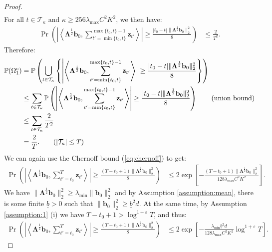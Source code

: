 \begin{proof}
\begin{align*}
\end{align*}
For all $t \in \mathcal{T}_{\kappa}$ and $\kappa \geq 256\lambda_{\max}C^2K^2$, we then have: 
\begin{align*}
    \Pr\left(\left|\left\langle\boldsymbol{\Lambda}^{\frac{1}{2}}\mathbf{b}_0, \sum_{t'=\min\{t_0,t\}}^{\max\{t_0,t\}-1}\mathbf{z}_{t'} \right\rangle\right| \geq \frac{|t_0-t| \lVert\boldsymbol{\Lambda}^{\frac{1}{2}} \mathbf{b}_0\rVert_2^2}{8}\right) &\leq \frac{2}{T^2}.
\end{align*}
Therefore:
\begin{align*}
    \Pr(\Omega^c_1) &= \Pr\left(\bigcup_{t \in \mathcal{T}_{\kappa}} \left\{\left|\left\langle\boldsymbol{\Lambda}^{\frac{1}{2}}\mathbf{b}_0, \sum_{t'=\min\{t_0,t\}}^{\max\{t_0,t\}-1}\mathbf{z}_{t'} \right\rangle\right| \geq \frac{|t_0-t| \lVert\boldsymbol{\Lambda}^{\frac{1}{2}} \mathbf{b}_0\rVert_2^2}{8}\right\} \right) \\
    &\leq \sum_{t \in \mathcal{T}_{\kappa}}\Pr\left(\left|\left\langle\boldsymbol{\Lambda}^{\frac{1}{2}}\mathbf{b}_0, \sum_{t'=\min\{t_0,t\}}^{\max\{t_0,t\}-1}\mathbf{z}_{t'} \right\rangle\right| \geq \frac{|t_0-t| \lVert\boldsymbol{\Lambda}^{\frac{1}{2}} \mathbf{b}_0\rVert_2^2}{8}\right)\tag{union bound} \\
    &\leq \sum_{t \in \mathcal{T}_{\kappa}} \frac{2}{T^2} \\
    &= \frac{2}{T}.\tag{$| \mathcal{T}_{\kappa}| \leq T$} 
\end{align*}
We can again use the Chernoff bound (\ref{eq:chernoff}) to get: 
\begin{align*}
    \Pr\left(\left|\left\langle\boldsymbol{\Lambda}^{\frac{1}{2}}\mathbf{b}_0, \sum_{t'=t_0}^T \mathbf{z}_{t'} \right\rangle\right| \geq \frac{(T-t_0+1) \lVert\boldsymbol{\Lambda}^{\frac{1}{2}} \mathbf{b}_0\rVert_2^2}{8}\right) &\leq 2\exp\left[-\frac{(T-t_0+1)\lVert\boldsymbol{\Lambda}^{\frac{1}{2}} \mathbf{b}_0\rVert^2_2}{128\lambda_{\max}C^2K^2}\right].
\end{align*}
We have $\lVert\boldsymbol{\Lambda}^{\frac{1}{2}} \mathbf{b}_0\rVert^2_2 \geq \lambda_{\min} \lVert \mathbf{b}_0\rVert^2_2$ and by Assumption \ref{assumption:mean}, there is some finite $\underline{b} > 0$ such that $\lVert\mathbf{b}_0\rVert_2^2 \geq \underline{b}^2 d$. At the same time, by Assumption \ref{assumption:1} (i) we have $T-t_0 +1 > \log^{1+\varepsilon} T$, and thus:
\begin{align*}
    \Pr\left(\left|\left\langle\boldsymbol{\Lambda}^{\frac{1}{2}}\mathbf{b}_0, \sum_{t'=t_0}^T \mathbf{z}_{t'} \right\rangle\right| \geq \frac{(T-t_0+1) \lVert\boldsymbol{\Lambda}^{\frac{1}{2}} \mathbf{b}_0\rVert_2^2}{8}\right) &\leq 2\exp\left[-\frac{\lambda_{\min}\underline{b}^2d }{128\lambda_{\max}C^2K^2}\log^{1+\varepsilon} T\right].

\end{align*}
\end{proof}
